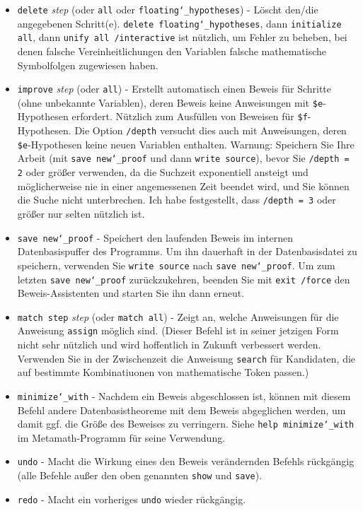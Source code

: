 \begin{itemize}
\item[]
    \texttt{delete} {\em step} (oder \texttt{all} oder \texttt{floating{\char`\_}hypotheses}) - Löscht den/die angegebenen Schritt(e).  \texttt{delete floating{\char`\_}hypotheses}, dann \texttt{initialize all}, dann \texttt{unify all /interactive} ist nützlich, um Fehler zu beheben, bei denen falsche Vereinheitlichungen den Variablen falsche mathematische Symbolfolgen zugewiesen haben.
\item[]
    \texttt{improve} {\em step} (oder \texttt{all}) - Erstellt automatisch einen Beweis für Schritte (ohne unbekannte Variablen), deren Beweis keine Anweisungen mit \texttt{\$e}-Hypothesen erfordert.  Nützlich zum Ausfüllen von Beweisen für \texttt{\$f}-Hypothesen.  Die Option \texttt{/depth} versucht dies auch mit Anweisungen, deren \texttt{\$e}-Hypothesen keine neuen Variablen enthalten.  {Warnung:} Speichern Sie Ihre Arbeit (mit \texttt{save new{\char`\_}proof} und dann \texttt{write source}), bevor Sie \texttt{/depth = 2} oder größer verwenden, da die Suchzeit exponentiell ansteigt und möglicherweise nie in einer angemessenen Zeit beendet wird, und Sie können die Suche nicht unterbrechen.  Ich habe festgestellt, dass \texttt{/depth = 3} oder größer nur selten nützlich ist.
 \item[]
    \texttt{save new{\char`\_}proof} - Speichert den laufenden Beweis im internen Datenbasispuffer des Programms.  Um ihn dauerhaft in der Datenbasisdatei zu speichern, verwenden Sie \texttt{write source} nach \texttt{save new{\char`\_}proof}.  Um zum letzten \texttt{save new{\char`\_}proof} zurückzukehren, beenden Sie mit \texttt{exit /force} den Beweis-Assistenten und starten Sie ihn dann erneut.
 \item[]
    \texttt{match step} {\em step} (oder \texttt{match all}) - Zeigt an, welche Anweisungen für die Anweisung \texttt{assign} möglich sind. (Dieser Befehl ist in seiner jetzigen Form nicht sehr nützlich und wird hoffentlich in Zukunft verbessert werden.  Verwenden Sie in der Zwischenzeit die Anweisung \texttt{search} für Kandidaten, die auf bestimmte Kombinatiuonen von mathematische Token passen.)
 \item[]
 \texttt{minimize{\char`\_}with}
     - Nachdem ein Beweis abgeschlossen ist, können mit diesem Befehl andere Datenbasistheoreme mit dem Beweis abgeglichen werden, um damit ggf. die Größe des Beweises zu verringern.  Siehe \texttt{help minimize{\char`\_}with} im Metamath-Programm für seine Verwendung.
 \item[]
 \texttt{undo}
    - Macht die Wirkung eines den Beweis verändernden Befehls rückgängig (alle Befehle außer den oben genannten \texttt{show} und \texttt{save}).
 \item[]
 \texttt{redo}
    - Macht ein vorheriges \texttt{undo} wieder rückgängig.
\end{itemize}

